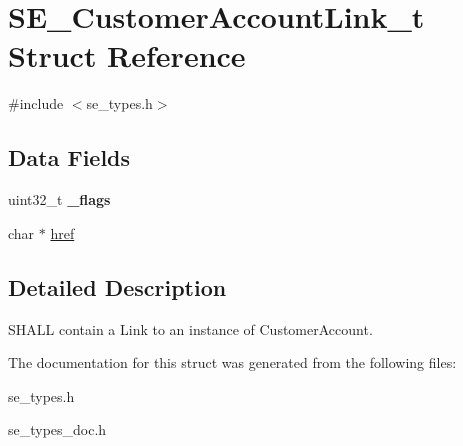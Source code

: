 \hypertarget{structSE__CustomerAccountLink__t}{}\section{S\+E\+\_\+\+Customer\+Account\+Link\+\_\+t Struct Reference}
\label{structSE__CustomerAccountLink__t}


{\ttfamily \#include $<$se\+\_\+types.\+h$>$}

\subsection*{Data Fields}
\begin{DoxyCompactItemize}
\item 
uint32\+\_\+t {\bfseries \+\_\+flags}
\item 
char $\ast$ \hyperlink{group__CustomerAccountLink_gade16911557e0fd6f102bbcf2573aa757}{href}
\end{DoxyCompactItemize}


\subsection{Detailed Description}
S\+H\+A\+LL contain a Link to an instance of Customer\+Account. 

The documentation for this struct was generated from the following files\+:\begin{DoxyCompactItemize}
\item 
se\+\_\+types.\+h\item 
se\+\_\+types\+\_\+doc.\+h\end{DoxyCompactItemize}
